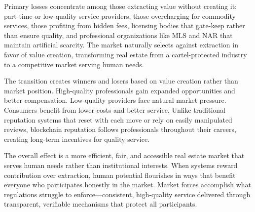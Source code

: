 Primary losses concentrate among those extracting value without creating it: part-time or low-quality service providers, those overcharging for commodity services, those profiting from hidden fees, licensing bodies that gate-keep rather than ensure quality, and professional organizations like MLS and NAR that maintain artificial scarcity. The market naturally selects against extraction in favor of value creation, transforming real estate from a cartel-protected industry to a competitive market serving human needs.

The transition creates winners and losers based on value creation rather than market position. High-quality professionals gain expanded opportunities and better compensation. Low-quality providers face natural market pressure. Consumers benefit from lower costs and better service. Unlike traditional reputation systems that reset with each move or rely on easily manipulated reviews, blockchain reputation follows professionals throughout their careers, creating long-term incentives for quality service.

The overall effect is a more efficient, fair, and accessible real estate market that serves human needs rather than institutional interests. When systems reward contribution over extraction, human potential flourishes in ways that benefit everyone who participates honestly in the market. Market forces accomplish what regulations struggle to enforce---consistent, high-quality service delivered through transparent, verifiable mechanisms that protect all participants.